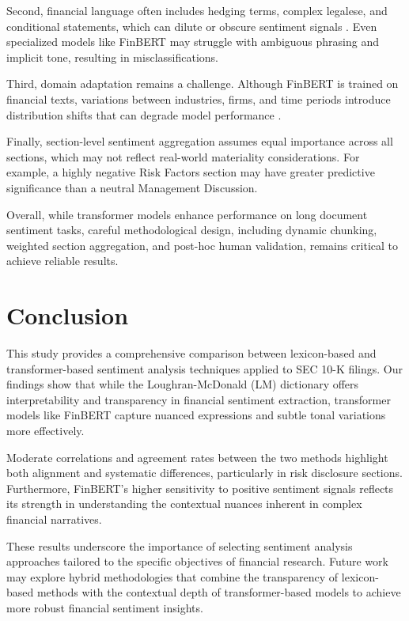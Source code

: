 \documentclass[12pt]{article}
\begin{document}
Second, financial language often includes hedging terms, complex legalese, and conditional statements, which can dilute or obscure sentiment signals \citep{Loughran2011}. Even specialized models like FinBERT may struggle with ambiguous phrasing and implicit tone, resulting in misclassifications.

Third, domain adaptation remains a challenge. Although FinBERT is trained on financial texts, variations between industries, firms, and time periods introduce distribution shifts that can degrade model performance \citep{Huang2020}.

Finally, section-level sentiment aggregation assumes equal importance across all sections, which may not reflect real-world materiality considerations. For example, a highly negative Risk Factors section may have greater predictive significance than a neutral Management Discussion.

Overall, while transformer models enhance performance on long document sentiment tasks, careful methodological design, including dynamic chunking, weighted section aggregation, and post-hoc human validation, remains critical to achieve reliable results.

\section{Conclusion}
This study provides a comprehensive comparison between lexicon-based and transformer-based sentiment analysis techniques applied to SEC 10-K filings. Our findings show that while the Loughran-McDonald (LM) dictionary offers interpretability and transparency in financial sentiment extraction, transformer models like FinBERT capture nuanced expressions and subtle tonal variations more effectively. 

Moderate correlations and agreement rates between the two methods highlight both alignment and systematic differences, particularly in risk disclosure sections. Furthermore, FinBERT's higher sensitivity to positive sentiment signals reflects its strength in understanding the contextual nuances inherent in complex financial narratives.

These results underscore the importance of selecting sentiment analysis approaches tailored to the specific objectives of financial research. Future work may explore hybrid methodologies that combine the transparency of lexicon-based methods with the contextual depth of transformer-based models to achieve more robust financial sentiment insights.
\end{document}
